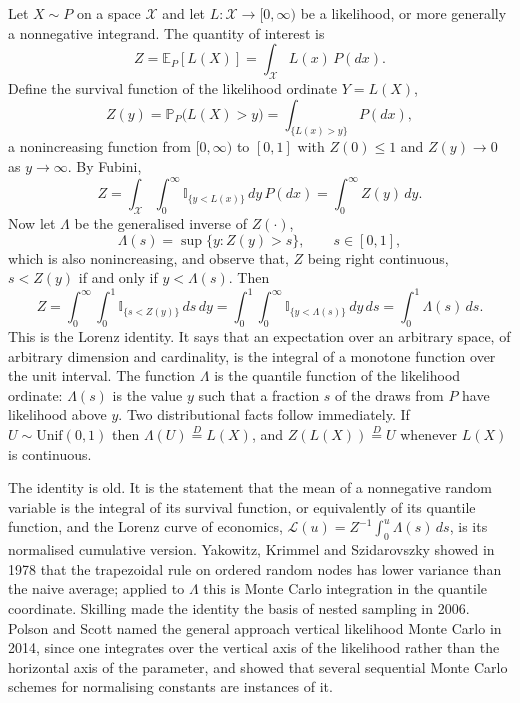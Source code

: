 \documentclass[11pt,twoside,openany]{book}
\theoremstyle{plain}
\theoremstyle{definition}
\theoremstyle{remark}
\newcommand{\PP}{\mathbb{P}}
\newcommand{\EE}{\mathbb{E}}
\newcommand{\Ind}{\mathbb{I}}
\newcommand{\cX}{\mathcal{X}}
\newcommand{\cL}{\mathcal{L}}
\begin{document}
Let $X \sim P$ on a space $\cX$ and let $L: \cX \to [0, \infty)$ be a likelihood, or more generally a nonnegative integrand. The quantity of interest is
\[
Z = \EE_P[L(X)] = \int_\cX L(x) \, P(dx) .
\]
Define the survival function of the likelihood ordinate $Y = L(X)$,
\[
Z(y) = \PP_P\big( L(X) > y \big) = \int_{\{L(x) > y\}} P(dx) ,
\]
a nonincreasing function from $[0, \infty)$ to $[0, 1]$ with $Z(0) \le 1$ and $Z(y) \to 0$ as $y \to \infty$. By Fubini,
\begin{equation}
Z = \int_\cX \int_0^\infty \Ind_{\{y < L(x)\}} \, dy \, P(dx) = \int_0^\infty Z(y) \, dy .
\label{eq:fubini}
\end{equation}
Now let $\Lambda$ be the generalised inverse of $Z(\cdot)$,
\[
\Lambda(s) = \sup\{ y : Z(y) > s \} , \qquad s \in [0, 1] ,
\]
which is also nonincreasing, and observe that, $Z$ being right continuous, $s < Z(y)$ if and only if $y < \Lambda(s)$. Then
\begin{equation}
Z = \int_0^\infty \int_0^1 \Ind_{\{s < Z(y)\}} \, ds \, dy = \int_0^1 \int_0^\infty \Ind_{\{y < \Lambda(s)\}} \, dy \, ds = \int_0^1 \Lambda(s) \, ds .
\label{eq:lorenz}
\end{equation}
This is the Lorenz identity. It says that an expectation over an arbitrary space, of arbitrary dimension and cardinality, is the integral of a monotone function over the unit interval. The function $\Lambda$ is the quantile function of the likelihood ordinate: $\Lambda(s)$ is the value $y$ such that a fraction $s$ of the draws from $P$ have likelihood above $y$. Two distributional facts follow immediately. If $U \sim \mathrm{Unif}(0, 1)$ then $\Lambda(U) \overset{D}{=} L(X)$, and $Z(L(X)) \overset{D}{=} U$ whenever $L(X)$ is continuous.

The identity is old. It is the statement that the mean of a nonnegative random variable is the integral of its survival function, or equivalently of its quantile function, and the Lorenz curve of economics, $\cL(u) = Z^{-1} \int_0^u \Lambda(s) \, ds$, is its normalised cumulative version. Yakowitz, Krimmel and Szidarovszky showed in 1978 that the trapezoidal rule on ordered random nodes has lower variance than the naive average; applied to $\Lambda$ this is Monte Carlo integration in the quantile coordinate. Skilling made the identity the basis of nested sampling in 2006. Polson and Scott named the general approach vertical likelihood Monte Carlo in 2014, since one integrates over the vertical axis of the likelihood rather than the horizontal axis of the parameter, and showed that several sequential Monte Carlo schemes for normalising constants are instances of it.
\end{document}
